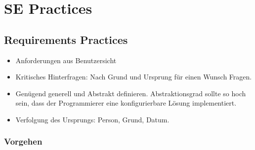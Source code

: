 \section{SE Practices}

\subsection{Requirements Practices}

\begin{itemize}
	\item Anforderungen aus Benutzersicht
	\item Kritisches Hinterfragen: Nach Grund und Ursprung für einen Wunsch Fragen.
	\item Genügend generell und Abstrakt definieren. Abstraktionsgrad sollte so hoch sein, dass der Programmierer eine konfigurierbare Lösung implementiert. 
	\item Verfolgung des Ursprungs: Person, Grund, Datum.
\end{itemize}

\subsubsection{Vorgehen}

